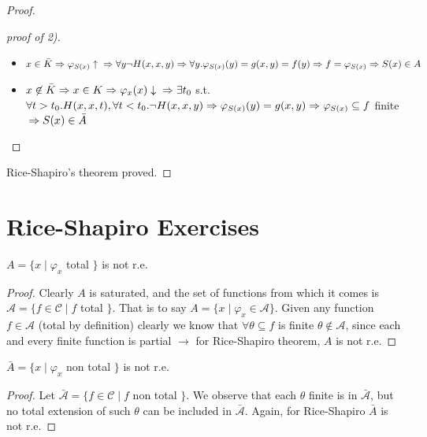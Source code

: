 \begin{proof}
\begin{proof}[proof of 2)]
    \begin{itemize}
    \item $ x\in\bar{K}\\ \Rightarrow\varphi_{S(x)}\uparrow \\
      \Rightarrow\forall y\lnot H(x,x,y)\\ \Rightarrow \forall
      y.\varphi_{S(x)}(y) = g(x,y) = f(y)\\ \Rightarrow f = \varphi_{S(x)}\\
      \Rightarrow S(x)\in A$
    \item
      $ x\not\in\bar{K}\\ \Rightarrow x\in K\\ \Rightarrow
      \varphi_x(x)\downarrow\\ \Rightarrow \exists t_0 $ s.t.
      $ \forall
      t>t_0. H(x,x,t), \forall t<t_0. \lnot H(x,x,y)\\
      \Rightarrow\varphi_{S(x)}(y) = g(x,y)\\ \Rightarrow
      \varphi_{S(x)}\subseteq f$ finite
      $\\ \Rightarrow S(x) \in \bar{A} $
    \end{itemize}
  \end{proof}

  Rice-Shapiro's theorem proved.
\end{proof}

\section{Rice-Shapiro Exercises}

\begin{example}\label{exe:rice1}
  $A = \{ x \mid \varphi_x $ total $\}$ is not r.e.

  \begin{proof}
    Clearly $A$ is saturated, and the set of functions from which it
    comes is $\mathcal{A} = \{f \in \mathcal{C} \mid f $ total
    $\}$. That is to say $A = \{x \mid \varphi_x \in
    \mathcal{A}\}$. Given any function $f \in \mathcal{A}$ (total by
    definition) clearly we know that $\forall \theta \subseteq f$
    is finite $\theta \notin \mathcal{A}$, since each and every finite
    function is partial $\rightarrow$ for Rice-Shapiro theorem, $A$ is
    not r.e.
  \end{proof}
\end{example}

\begin{example}\label{exe:rice2}
  $\bar{A} = \{x \mid \varphi_x $ non total $\}$ is not r.e.

  \begin{proof}
    Let $\bar{\mathcal{A}} = \{f \in \mathcal{C} \mid f $ non total
    $\}$. We observe that each $\theta$ finite is in
    $\bar{\mathcal{A}}$, but no total extension of such $\theta$ can
    be included in $\bar{\mathcal{A}}$. Again, for Rice-Shapiro
    $\bar{A}$ is not r.e.
  \end{proof}
\end{example}

